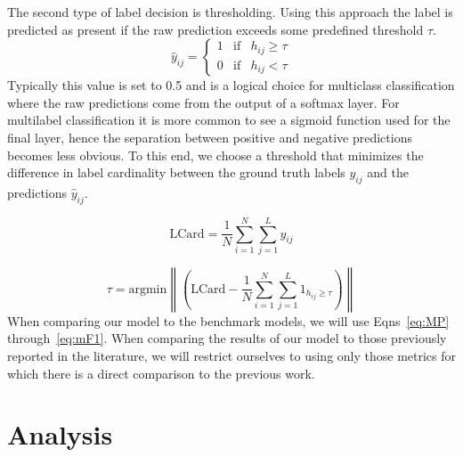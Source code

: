 \documentclass[12pt,journal,compsoc]{IEEEtran}
\begin{document}
The second type of label decision is thresholding. Using this approach the label is predicted as present if the raw prediction exceeds some predefined threshold $\tau$. 
\begin{equation}
\hat{y}_{ij} = \left\{
    \begin{array}{lll}
        1 & \mathrm{if} & h_{ij} \geq \tau \\
        0 & \mathrm{if} & h_{ij} < \tau
    \end{array}
\right.
\end{equation}
Typically this value is set to 0.5 and is a logical choice for multiclass classification where the raw predictions come from the output of a softmax layer.  For multilabel classification it is more common to see a sigmoid function used for the final layer, hence the separation between positive and negative predictions becomes less obvious. To this end, we choose a threshold that minimizes the difference in label cardinality between the ground truth labels $y_{ij}$ and the predictions $\hat{y}_{ij}$.~\cite{Read:2011}

\begin{equation}
\mathrm{LCard} = \frac{1}{N}\sum_{i=1}^{N}\sum_{j=1}^{L}y_{ij}
\end{equation}

\begin{equation}
\tau = \mathrm{argmin}\left\|\left(\mathrm{LCard}-\frac{1}{N}\sum_{i=1}^{N}\sum_{j=1}^{L}1_{h_{ij} \geq \tau}\right)\right\|
\end{equation}
When comparing our model to the benchmark models, we will use Eqns~\ref{eq:MP} through~\ref{eq:mF1}. When comparing the results of our model to those previously reported in the literature, we will restrict ourselves to using only those metrics for which there is a direct comparison to the previous work.


\section{Analysis} %
\end{document}
